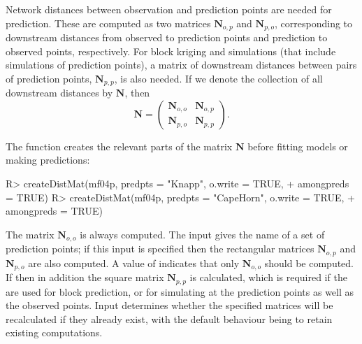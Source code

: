 \documentclass[nojss]{jss}
\renewenvironment{Schunk}{\vspace{\topsep}}{\vspace{\topsep}}
\begin{document}
Network distances between observation and prediction points are needed
for prediction. These are computed as two matrices $\mathbf{N}_{o,p}$
and $\mathbf{N}_{p,o}$, corresponding to downstream distances from
observed to prediction points and prediction to observed points,
respectively. For block kriging and simulations (that include
simulations of prediction points), a matrix of downstream distances
between pairs of prediction points, $\mathbf{N}_{p,p}$, is also
needed. If we denote the collection of all downstream distances by
$\mathbf{N}$, then \begin{equation} \mathbf{N} = \left(
\begin{array}{c|c} \mathbf{N}_{o,o} & \mathbf{N}_{o,p} \\ \hline
\mathbf{N}_{p,o} & \mathbf{N}_{p,p} \end{array} \right).
\end{equation}

The function  creates the relevant parts of the
matrix $\mathbf{N}$ before fitting models or making predictions:

\begin{Schunk}
\begin{Sinput}
R> createDistMat(mf04p, predpts = "Knapp", o.write = TRUE,
+  	amongpreds = TRUE)
R> createDistMat(mf04p, predpts = "CapeHorn", o.write = TRUE,
+  	amongpreds = TRUE)
\end{Sinput}
\end{Schunk}

The matrix $\mathbf{N}_{o,o}$ is always computed. The input
 gives the name of a set of prediction points; if this
input is specified then the rectangular matrices $\mathbf{N}_{o,p}$
and $\mathbf{N}_{p,o}$ are also computed.  A value of  indicates that only $\mathbf{N}_{o,o}$ should be computed. If
 then in addition the square matrix
$\mathbf{N}_{p,p}$ is calculated, which is required if the  are used for block prediction, or for simulating at the prediction points as well as the observed points. Input  determines
whether the specified matrices will be recalculated if they already
exist, with the default behaviour being to retain existing
computations.

%
%
\end{document}
